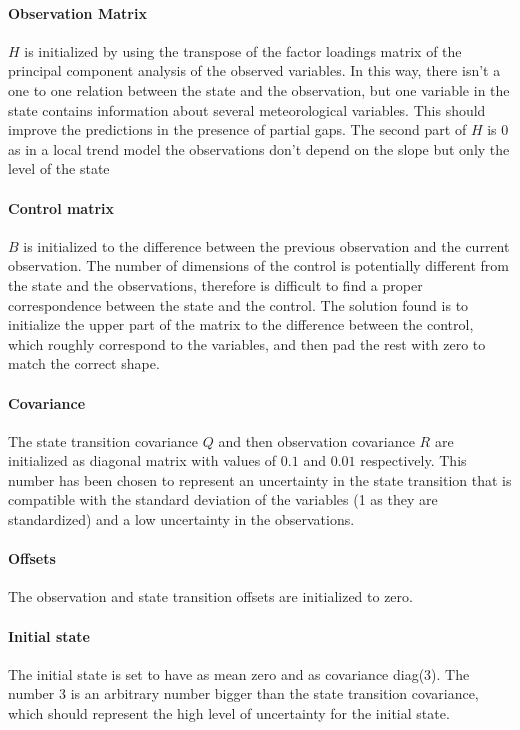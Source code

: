 \documentclass{article}
\begin{document}
\paragraph{Observation Matrix} $H$ is initialized by using the transpose of the factor loadings matrix of the principal component analysis of the observed variables. In this way, there isn't a one  to one relation between the state and the observation, but one variable in the state contains information about several meteorological variables. This should improve the predictions in the presence of partial gaps. The second part of $H$ is 0 as in a local trend model the observations don't depend on the slope but only the level of the state

\paragraph{Control matrix} $B$ is initialized to the difference between the previous observation and the current observation. The number of dimensions of the control is potentially different from the state and the observations, therefore is difficult to find a proper correspondence between the state and the control. The solution found is to initialize the upper part of the matrix to the difference between the control, which roughly correspond to the variables, and then pad the rest with zero to match the correct shape.

\paragraph{Covariance} The state transition covariance $Q$ and then observation covariance $R$ are initialized as diagonal matrix with values of $0.1$ and $0.01$ respectively. This number has been chosen to represent an uncertainty in the state transition that is compatible with the standard deviation of the variables (1 as they are standardized) and a low uncertainty in the observations. 

\paragraph{Offsets} The observation and state transition offsets are initialized to zero.

\paragraph{Initial state} The initial state is set to have as mean zero and as covariance diag(3). The number 3 is an arbitrary number bigger than the state transition covariance, which should represent the high level of uncertainty for the initial state.  
\end{document}
